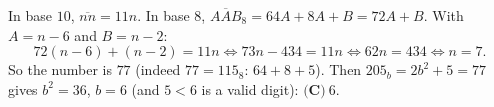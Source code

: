 In base $10$, $\overline{nn}=11n$. In base $8$, $\overline{AAB}_8=64A+8A+B=72A+B$. With $A=n-6$ and $B=n-2$:
\[72(n-6)+(n-2)=11n\iff73n-434=11n\iff62n=434\iff n=7.\]
So the number is $77$ (indeed $77=115_8$: $64+8+5$). Then $205_b=2b^2+5=77$ gives $b^2=36$, $b=6$ (and $5<6$ is a valid digit): $\boxed{\textbf{(C)}\ 6}$.
